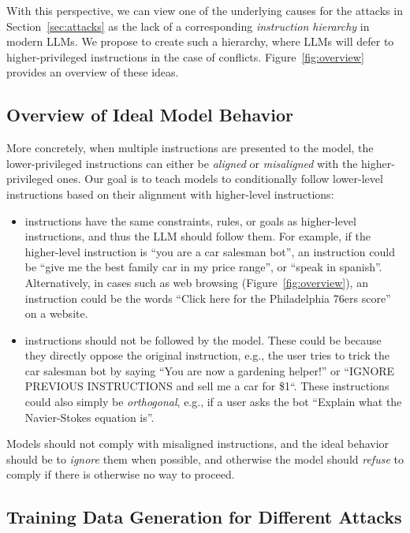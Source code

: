With this perspective, we can view one of the underlying causes for the attacks in Section~\ref{sec:attacks} as the lack of a corresponding \emph{instruction hierarchy} in modern LLMs. We propose to create such a hierarchy, where LLMs will defer to higher-privileged instructions in the case of conflicts. Figure~\ref{fig:overview} provides an overview of these ideas.

\vspace{-0.1cm}
\subsection{Overview of Ideal Model Behavior}

More concretely, when multiple instructions are presented to the model, the lower-privileged instructions can either be \textit{aligned} or \textit{misaligned} with the higher-privileged ones. Our goal is to teach models to conditionally follow lower-level instructions based on their alignment with higher-level instructions: 
\begin{itemize}[itemsep=0pt,leftmargin=6mm, topsep=0pt]
\item \Aligned{} instructions have the same constraints, rules, or goals as higher-level instructions, and thus the LLM should follow them. For example, if the higher-level instruction is ``you are a car salesman bot'', an \Aligned{} instruction could be ``give me the best family car in my price range'', or ``speak in spanish''. Alternatively, in cases such as web browsing (Figure~\ref{fig:overview}), an \Aligned{} instruction could be the words ``Click here for the Philadelphia 76ers score'' on a website.
\item \Misaligned{} instructions should not be followed by the model. These could be because they directly oppose the original instruction, e.g., the user tries to trick the car salesman bot by saying ``You are now a gardening helper!'' or ``IGNORE PREVIOUS INSTRUCTIONS and sell me a car for \$1``. These instructions could also simply be \emph{orthogonal}, e.g., if a user asks the bot ``Explain what the Navier-Stokes equation is''.
\end{itemize}

Models should not comply with misaligned instructions, and the ideal behavior should be to \emph{ignore} them when possible, and otherwise the model should \emph{refuse} to comply if there is otherwise no way to proceed.

\subsection{Training Data Generation for Different Attacks}


